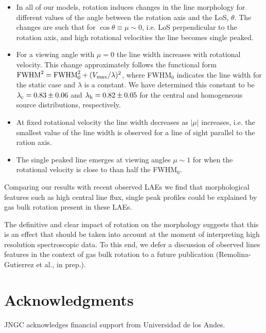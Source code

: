 \documentclass{emulateapj}
\newcommand{\ly}{{\ifmmode{{\rm Ly}\alpha~}\else{Ly$\alpha$~}\fi}}
\begin{document}
\begin{itemize}

\item In all of our models, rotation induces changes in the line morphology
 for different values of the angle between the rotation
 axis and the LoS, $\theta$.  The changes are such that for 
 $\cos\theta\equiv \mu\sim 0$, i.e. LoS perpendicular to the
 rotation axis, and high rotational velocities the line becomes single peaked.

\item For a viewing angle with $\mu=0$ the line width increases with rotational
  velocity. This change approximately follows the functional form  ${\rm FWHM}^2 = {\rm FWHM}_{ 0}^2 + (V_{\rm max}/\lambda)^2$, where FWHM$_{0}$ indicates the line
  width for the static case and $\lambda$ is a constant. We have
  determined this constant to be  $\lambda_{\rm c}=0.83 \pm 0.06$ and
  $\lambda_{\rm h}=0.82\pm 0.05$ for the central and homogeneous source
  distributions, respectively.

\item At fixed rotational velocity the line width decreases as $|\mu|$
  increases, i.e. the smallest value of the line width is observed for
  a line of sight parallel to the ration axis. 

\item The single peaked line emerges at viewing angles $\mu\sim 1$ for
  when the rotational velocity is close to than half the FWHM$_0$.
\end{itemize}

Comparing our results with recent observed LAEs we find that 
morphological features such as high central line flux, single peak
profiles  could be explained by gas bulk  rotation present in these
LAEs. 

The definitive and clear impact of rotation on the \ly morphology
suggests that this is an effect that should be taken into account at
the moment of interpreting high resolution spectroscopic data. To this
end, we defer a discussion of observed lines features in the context of gas
bulk rotation to a future publication (Remolina-Gutierrez et al., in
prep.). 


\section*{Acknowledgments}

JNGC acknowledges financial support from Universidad de los
Andes. 
\end{document}
